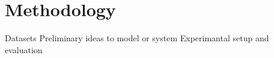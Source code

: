 \chapter{Methodology}
Datasets
Preliminary ideas to model or system
Experimantal setup and evaluation